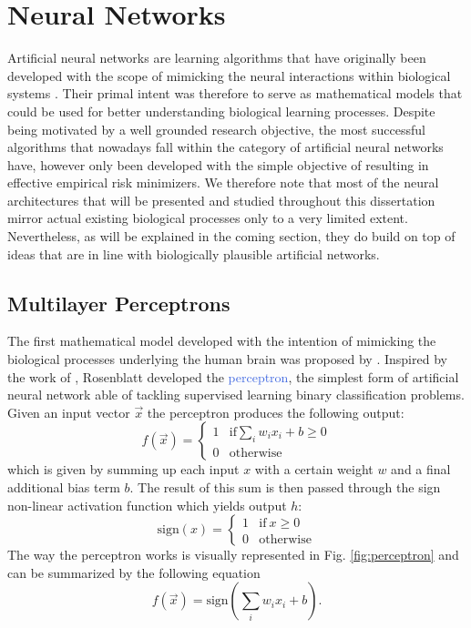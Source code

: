 \section{Neural Networks}
\label{sec:neural_networks}
Artificial neural networks are learning algorithms that have originally been developed with the scope of mimicking the neural interactions within biological systems \cite{mitchell1997machine}. Their primal intent was therefore to serve as mathematical models that could be used for better understanding biological learning processes. Despite being motivated by a well grounded research objective, the most successful algorithms that nowadays fall within the category of artificial neural networks have, however only been developed with the simple objective of resulting in effective empirical risk minimizers. We therefore note that most of the neural architectures that will be presented and studied throughout this dissertation mirror actual existing biological processes only to a very limited extent. Nevertheless, as will be explained in the coming section, they do build on top of ideas that are in line with biologically plausible artificial networks.   

\subsection{Multilayer Perceptrons}
\label{sec:general_architecture}
The first mathematical model developed with the intention of mimicking the biological processes underlying the human brain was proposed by \citet{rosenblatt1958perceptron}. Inspired by the work of \citet{mcculloch1943logical}, Rosenblatt developed the \textcolor{RoyalBlue}{perceptron}, the simplest form of artificial neural network able of tackling supervised learning binary classification problems. Given an input vector $\vec{x}$ the perceptron produces the following output:
\begin{equation}
	f(\vec{x}) = 
		\begin{cases}
			1  & \text{if} \sum_i w_i x_i + b \geq 0 \\
			0 & \text{otherwise}
		\end{cases}
\end{equation}
which is given by summing up each input $x$ with a certain weight $w$ and a final additional bias term $b$. The result of this sum is then passed through the sign non-linear activation function which yields output $h$:
\begin{equation}
	\text{sign}(x) = 
		\begin{cases}
			1  & \text{if} \: x \geq 0 \\
			0 & \text{otherwise}
		\end{cases}
\end{equation}
The way the perceptron works is visually represented in Fig. \ref{fig:perceptron} and can be summarized by the following equation
\begin{equation}
	f(\vec{x}) = \text{sign}(\sum_i w_i x_i + b).
	\label{eq:perceptron_equation}
\end{equation}

